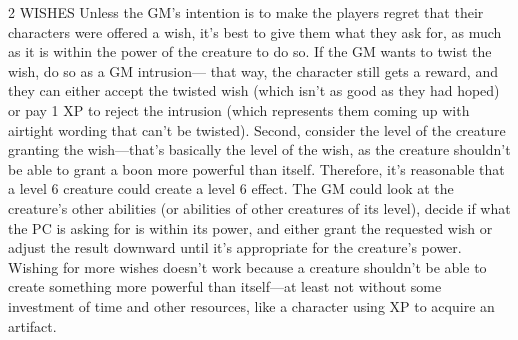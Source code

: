\begin{multicols}{2}
WISHES
Unless the GM’s intention is to make the players regret that their characters were offered a wish, it’s best to give them what they ask for, as much as it is within the power of the creature to do so. If the GM wants to twist the wish, do so as a GM intrusion— that way, the character still gets a reward, and they can either accept the twisted wish (which isn’t as good as they had hoped) or pay 1 XP to reject the intrusion (which represents them coming up with airtight wording that can’t be twisted).
	Second, consider the level of the creature granting the wish—that’s basically the level of the wish, as the creature shouldn’t be able to grant a boon more powerful than itself. Therefore, it’s reasonable that a level 6 creature could create a level 6 effect. The GM could look at the creature’s other abilities (or abilities of other creatures of its level), decide if what the PC is asking for is within its power, and either grant the requested wish or adjust the result downward until it’s appropriate for the creature’s power. 
	Wishing for more wishes doesn’t work because a creature shouldn’t be able to create something more powerful than itself—at least not without some investment of time and other resources, like a character using XP to acquire an artifact.

\end{multicols}
